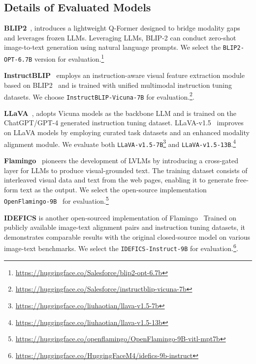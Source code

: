 \documentclass[11pt]{article}
\begin{document}
\subsection{Details of Evaluated Models}


\noindent\textbf{BLIP2}~\citep{li2023blip2}, 
introduces a lightweight Q-Former designed to bridge modality gaps and leverages frozen LLMs. Leveraging LLMs, BLIP-2 can conduct zero-shot image-to-text generation using natural language prompts. We select the \texttt{BLIP2-OPT-6.7B} version for evaluation.\footnote{\url{https://huggingface.co/Salesforce/blip2-opt-6.7b}}


\noindent\textbf{InstructBLIP}~\citep{dai2023instructblip} employs an instruction-aware visual feature extraction module based on BLIP2~\citep{li2023blip2} and is trained with unified multimodal instruction tuning datasets. We choose \texttt{InstructBLIP-Vicuna-7B} for evaluation.\footnote{\url{https://huggingface.co/Salesforce/instructblip-vicuna-7b}}.



\noindent\textbf{LLaVA}~\citep{liu2023llava},
adopts Vicuna models as the backbone LLM and is trained on the ChatGPT/GPT-4 generated instruction tuning dataset.
LLaVA-v1.5~\citep{liu2023llava15} improves on LLaVA models by employing curated task datasets and an enhanced modality alignment module.
We evaluate both \texttt{LLaVA-v1.5-7B}\footnote{\url{https://huggingface.co/liuhaotian/llava-v1.5-7b}} and \texttt{LLaVA-v1.5-13B}.\footnote{\url{https://huggingface.co/liuhaotian/llava-v1.5-13b}}


\noindent\textbf{Flamingo}~\citep{Alayrac2022FlamingoAV} pioneers the development of LVLMs by introducing a cross-gated layer for LLMs to produce visual-grounded text. The training dataset
consists of interleaved visual data and text from the web pages, enabling it to generate free-form text as the output. We select the open-source implementation \texttt{OpenFlamingo-9B}~\citep{awadalla2023openflamingo} for evaluation.\footnote{\url{https://huggingface.co/openflamingo/OpenFlamingo-9B-vitl-mpt7b}}

\noindent\textbf{IDEFICS} is another open-sourced implementation of Flamingo~\citep{Alayrac2022FlamingoAV} Trained on publicly available image-text alignment pairs and instruction tuning datasets, it demonstrates comparable results with the original closed-source model on various image-text benchmarks. We select the \texttt{IDEFICS-Instruct-9B} for evaluation.\footnote{\url{https://huggingface.co/HuggingFaceM4/idefics-9b-instruct}}.
\end{document}
